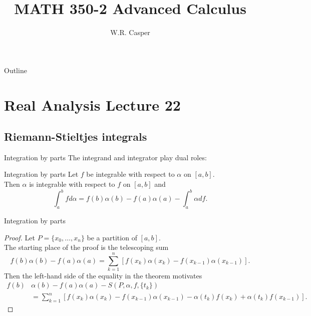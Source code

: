 \documentclass{beamer}
\title{MATH 350-2 Advanced Calculus}
\subtitle
{} %
\author[W.R. Casper] %
{W.R. Casper}
\institute[California State University Fullerton] %
{
  Department of Mathematics\\
  California State University Fullerton}
\begin{document}
\begin{frame}
  \titlepage
\end{frame}

\begin{frame}{Outline}
  \tableofcontents
\end{frame}



\section{Real Analysis Lecture 22}

\subsection{Riemann-Stieltjes integrals}

\begin{frame}{Integration by parts}
The integrand and integrator play dual roles:
\pause
\begin{thm}{Integration by parts}
\pause
Let $f$ be integrable with respect to $\alpha$ on $[a,b]$.\\
\pause
Then $\alpha$ is integrable with respect to $f$ on $[a,b]$ and
$$\int_a^b f d\alpha = f(b)\alpha(b)-f(a)\alpha(a)-\int_a^b \alpha df.$$
\end{thm}
\end{frame}

\begin{frame}{Integration by parts}
\begin{proof}
\pause
Let $P = \{x_0,\dots, x_n\}$ be a partition of $[a,b]$.\\
\pause
The starting place of the proof is the telescoping sum
$$f(b)\alpha(b)-f(a)\alpha(a) = \sum_{k=1}^n \left[f(x_k)\alpha(x_k)-f(x_{k-1})\alpha(x_{k-1})\right].$$
\pause
Then the left-hand side of the equality in the theorem motivates
{\small
\begin{align*}
f(b)&\alpha(b)-f(a)\alpha(a)-S(P,\alpha,f,\{t_k\})\\
  &= \sum_{k=1}^n\left[f(x_k)\alpha(x_k)-f(x_{k-1})\alpha(x_{k-1})-\alpha(t_k)f(x_k)+\alpha(t_k)f(x_{k-1})\right].
\end{align*}
}
\end{proof}
\end{frame}
\end{document}
